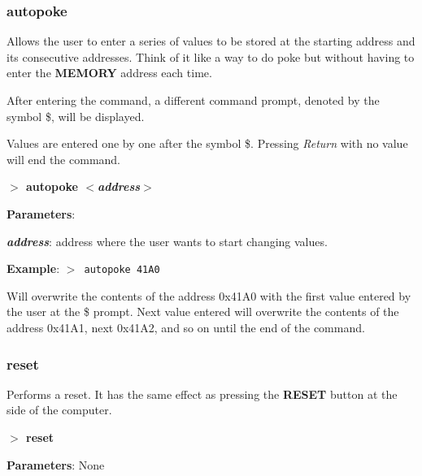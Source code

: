 \documentclass[a4paper,11pt]{article}
\begin{document}
        \subsubsection{{\color{blue}autopoke}}
        Allows the user to enter a series of values to be stored at the
        starting address and its consecutive addresses. Think of it like a
        way to do poke but without having to enter the \textbf{MEMORY}
        address each time.

        After entering the command, a different command prompt, denoted by
        the symbol \$, will be displayed.

        Values are entered one by one after the symbol \$. Pressing 
        \textit{Return} with no value will end the command.

        \hspace{1.9cm}\textbf{$>$ autopoke \textit{$<$address$>$}}

        \textbf{Parameters}:

        \hspace{1cm}\textbf{\textit{address}}: address where the user wants
        to start changing values.

        \textbf{Example}: \texttt{$>$ autopoke 41A0}

        Will overwrite the contents of the address 0x41A0 with the first
        value entered by the user at the \$ prompt. Next value entered will
        overwrite the contents of the address 0x41A1, next 0x41A2, and so on
        until the end of the command.

        \subsubsection{{\color{blue}reset}}
        Performs a reset. It has the same effect as pressing the
        \textbf{RESET} button at the side of the computer.

        \hspace{1.9cm}\textbf{$>$ reset}

        \textbf{Parameters}: None

\end{document}
